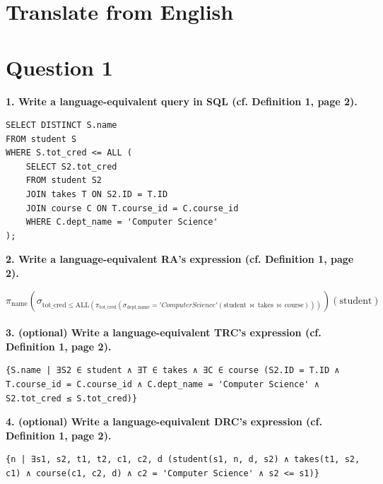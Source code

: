 \documentclass[12pt]{article}
\begin{document}
\thispagestyle{empty}


\begingroup
\hypersetup{linkcolor=black}

      

\setcounter{page}{1}
\pagestyle{plain}
\section{Translate from English}
\section*{Question 1}

\textbf{1. Write a language-equivalent query in SQL (cf. Definition 1, page 2).}

\begin{lstlisting}
SELECT DISTINCT S.name
FROM student S
WHERE S.tot_cred <= ALL (
    SELECT S2.tot_cred
    FROM student S2
    JOIN takes T ON S2.ID = T.ID
    JOIN course C ON T.course_id = C.course_id
    WHERE C.dept_name = 'Computer Science'
);
\end{lstlisting}

\textbf{2. Write a language-equivalent RA’s expression (cf. Definition 1, page 2).}

\[
\pi_{\text{name}} \left( \sigma_{\text{tot\_cred} \leq \text{ALL}(\pi_{\text{tot\_cred}} (\sigma_{\text{dept\_name}} = 'Computer Science' ( \text{student} \ \Join \ \text{takes} \ \Join \ \text{course})))} \right) (\text{student})
\]
\\
\textbf{3. (optional) Write a language-equivalent TRC’s expression (cf. Definition 1, page 2).}

\begin{lstlisting}
{S.name | ∃S2 ∈ student ∧ ∃T ∈ takes ∧ ∃C ∈ course (S2.ID = T.ID ∧ T.course_id = C.course_id ∧ C.dept_name = 'Computer Science' ∧ S2.tot_cred ≤ S.tot_cred)}
\end{lstlisting}

\textbf{4. (optional) Write a language-equivalent DRC’s expression (cf. Definition 1, page 2).}

\begin{lstlisting}
{n | ∃s1, s2, t1, t2, c1, c2, d (student(s1, n, d, s2) ∧ takes(t1, s2, c1) ∧ course(c1, c2, d) ∧ c2 = 'Computer Science' ∧ s2 <= s1)}
\end{lstlisting}
\end{document}

